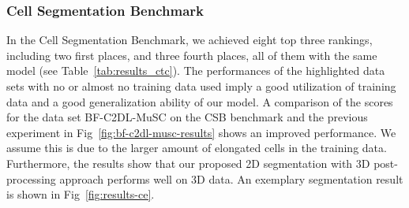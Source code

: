 \documentclass[10pt,letterpaper]{article}
\begin{document}
\subsubsection*{Cell Segmentation Benchmark}
In the Cell Segmentation Benchmark, we achieved eight top three rankings, including two first places, and three fourth places, all of them with the same model (see Table~\ref{tab:results_ctc}). The performances of the highlighted data sets with no or almost no training data used imply a good utilization of training data and a good generalization ability of our model. A comparison of the scores for the data set BF-C2DL-MuSC on the CSB benchmark and the previous experiment in Fig~\ref{fig:bf-c2dl-musc-results} shows an improved performance. We assume this is due to the larger amount of elongated cells in the training data. Furthermore, the results show that our proposed 2D segmentation with 3D post-processing approach performs well on 3D data. An exemplary segmentation result is shown in Fig~\ref{fig:results-ce}.
\end{document}

